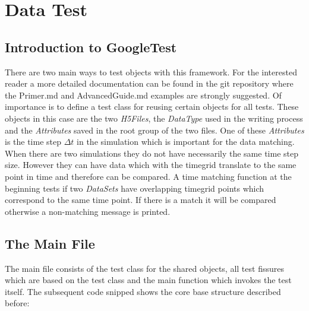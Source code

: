 \chapter{Data Test}

\section{Introduction to GoogleTest}
There are two main ways to test objects with this framework. For the interested reader a more detailed documentation can be found in the git repository \cite{googletestdoc} where the Primer.md and AdvancedGuide.md examples are strongly suggested. Of importance is to define a test class for reusing certain objects for all tests. These objects in this case are the two \textit{H5Files}, the \textit{DataType} used in the writing process and the \textit{Attributes} saved in the root group of the two files. One of these \textit{Attributes} is the time step $\Delta t$ in the simulation which is important for the data matching. When there are two simulations they do not have necessarily the same time step size. However they can have data which with the timegrid translate to the same point in time and therefore can be compared. A time matching function at the beginning tests if two \textit{DataSets} have overlapping timegrid points which correspond to the same time point. If there is a match it will be compared otherwise a non-matching message is printed.  

\section{The Main File}
\label{seq:testmain}
The main file consists of the test class for the shared objects, all test fissures which are based on the test class and the main function which invokes the test itself. The subsequent code snipped shows the core base structure described before:

